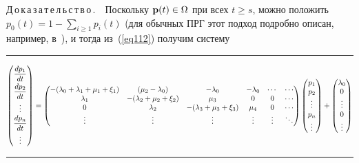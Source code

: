 \begin{multicols}{2}
\smallskip


\noindent
Д\,о\,к\,а\,з\,а\,т\,е\,л\,ь\,с\,т\,в\,о\,.\ \, Поскольку  ${\bf p}(t) \in \Omega$ при всех $t
\ge s$, можно положить
 $p_0(t) = 1 - \sum\limits_{i \ge 1} p_i(t)$ (для обычных ПРГ этот подход подробно описан, например, в~\cite{z06}),
 и тогда из~(\ref{eq112}) получим систему

 \end{multicols}
 
 \hrule
 
 \vspace*{6pt}
 
 \noindent
\begin{equation*}
\begin{pmatrix}
 \displaystyle\frac{\displaystyle dp_1\mathstrut}{\displaystyle dt\mathstrut}\\
 \displaystyle\frac{\displaystyle dp_2\mathstrut}{\displaystyle dt\mathstrut}\\
 \vdots\\
 \displaystyle\frac{\displaystyle dp_n\mathstrut}{\displaystyle dt\mathstrut}\\
\vdots
\end{pmatrix}=
\begin{pmatrix}
 -(\lambda_0+\lambda_1+\mu_1+\xi_1) & (\mu_2 -\lambda_0) & -\lambda_0 & -\lambda_0 & \cdots & \cdots\\
  \lambda_1 & -(\lambda_2+\mu_2+\xi_2) & \mu_3 & 0 &  0 &\cdots\\
 0 & \lambda_2 & -(\lambda_3+\mu_3+\xi_3) & \mu_4  & 0  & \cdots \\
\vdots & \vdots & \vdots & \vdots & \vdots & \ddots \\
\end{pmatrix}
\begin{pmatrix}
p_1 \\
p_2 \\
\vdots \\
p_n \\
\vdots
\end{pmatrix}
+
\begin{pmatrix}
\lambda_0 \\
0 \\
\vdots \\
0 \\
\vdots
\end{pmatrix}
\end{equation*} 

\hrule

